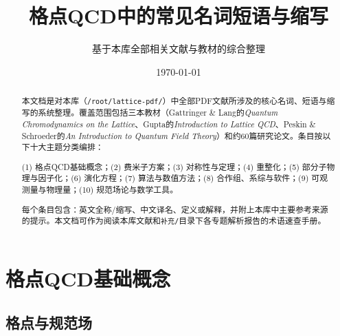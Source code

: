 \documentclass[12pt,a4paper]{ctexart}
\title{\heiti 格点QCD中的常见名词短语与缩写}
\author{基于本库全部相关文献与教材的综合整理}
\date{\today}
\begin{document}
\maketitle

\begin{abstract}
\noindent
本文档是对本库（\texttt{/root/lattice-pdf/}）中全部PDF文献所涉及的核心名词、短语与缩写的系统整理。覆盖范围包括三本教材（Gattringer \& Lang的\textit{Quantum Chromodynamics on the Lattice}、Gupta的\textit{Introduction to Lattice QCD}、Peskin \& Schroeder的\textit{An Introduction to Quantum Field Theory}）和约60篇研究论文。条目按以下十大主题分类编排：

(1) 格点QCD基础概念；(2) 费米子方案；(3) 对称性与定理；(4) 重整化；(5) 部分子物理与因子化；(6) 演化方程；(7) 算法与数值方法；(8) 合作组、系综与软件；(9) 可观测量与物理量；(10) 规范场论与数学工具。

每个条目包含：英文全称/缩写、中文译名、定义或解释，并附上本库中主要参考来源的提示。本文档可作为阅读本库文献和\texttt{补充/}目录下各专题解析报告的术语速查手册。
\end{abstract}

\tableofcontents
\newpage

\section{格点QCD基础概念}

\subsection*{格点与规范场}
\end{document}
